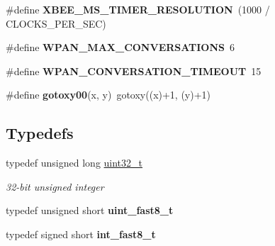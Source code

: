 \begin{DoxyCompactItemize}
\item 
\hypertarget{group__hal__dos_ga5cbeea4d9344138b657f78ad38813584}{\#define {\bfseries X\-B\-E\-E\-\_\-\-M\-S\-\_\-\-T\-I\-M\-E\-R\-\_\-\-R\-E\-S\-O\-L\-U\-T\-I\-O\-N}~(1000 / C\-L\-O\-C\-K\-S\-\_\-\-P\-E\-R\-\_\-\-S\-E\-C)}\label{group__hal__dos_ga5cbeea4d9344138b657f78ad38813584}

\item 
\hypertarget{group__hal__dos_gae34b1efc8ba99add17fcd767852197d4}{\#define {\bfseries W\-P\-A\-N\-\_\-\-M\-A\-X\-\_\-\-C\-O\-N\-V\-E\-R\-S\-A\-T\-I\-O\-N\-S}~6}\label{group__hal__dos_gae34b1efc8ba99add17fcd767852197d4}

\item 
\hypertarget{group__hal__dos_gaaa330f432d7a6bccdb393a656ddfe4d3}{\#define {\bfseries W\-P\-A\-N\-\_\-\-C\-O\-N\-V\-E\-R\-S\-A\-T\-I\-O\-N\-\_\-\-T\-I\-M\-E\-O\-U\-T}~15}\label{group__hal__dos_gaaa330f432d7a6bccdb393a656ddfe4d3}

\item 
\hypertarget{group__hal__dos_ga47eb4ad5b4e00af034717327c7fa909d}{\#define {\bfseries gotoxy00}(x, y)~gotoxy((x)+1, (y)+1)}\label{group__hal__dos_ga47eb4ad5b4e00af034717327c7fa909d}

\end{DoxyCompactItemize}
\subsection*{Typedefs}
\begin{DoxyCompactItemize}
\item 
\hypertarget{group__hal__dos_ga09a1e304d66d35dd47daffee9731edaa}{typedef unsigned long \hyperlink{group__hal__dos_ga09a1e304d66d35dd47daffee9731edaa}{uint32\-\_\-t}}\label{group__hal__dos_ga09a1e304d66d35dd47daffee9731edaa}

\begin{DoxyCompactList}\small\item\em 32-\/bit unsigned integer \end{DoxyCompactList}\item 
\hypertarget{group__hal__dos_gacce279dbc21c640ea1412e405c569887}{typedef unsigned short {\bfseries uint\-\_\-fast8\-\_\-t}}\label{group__hal__dos_gacce279dbc21c640ea1412e405c569887}

\item 
\hypertarget{group__hal__dos_gaa301edfd56a74118dc796a2f1aa67f20}{typedef signed short {\bfseries int\-\_\-fast8\-\_\-t}}\label{group__hal__dos_gaa301edfd56a74118dc796a2f1aa67f20}

\end{DoxyCompactItemize}
